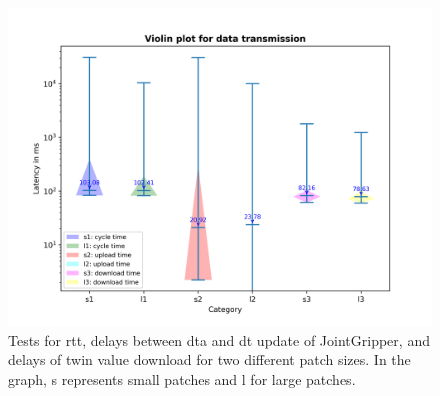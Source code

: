 \begin{figure}[htb]
    \includegraphics[width=\textwidth]{figures/tests/DT/violin_patch_size.png}
    \centering
    \caption{Tests for \gls{rtt}, delays between \gls{dta} and \gls{dt} 
    update of JointGripper, and delays of twin value download for 
    two different patch sizes. In the graph, s represents small patches 
    and l for large patches.\label{fig: UD-violin-patchsize}}
\end{figure}

